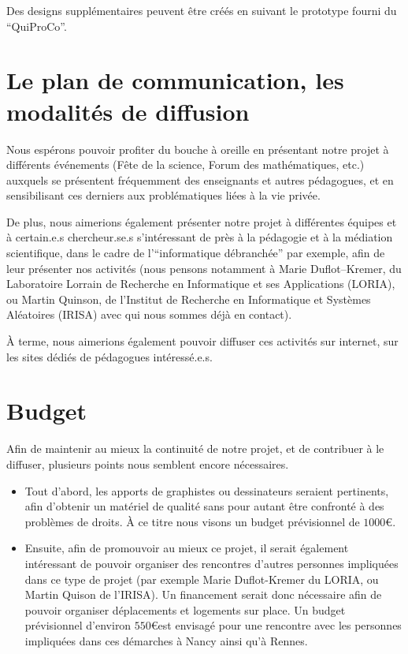 \documentclass[a4paper]{article}
\begin{document}
Des designs supplémentaires peuvent être créés en suivant le prototype fourni du \enquote{QuiProCo}.

\section*{Le plan de communication, les modalités de diffusion}

Nous espérons pouvoir profiter du bouche à oreille en présentant notre projet à différents événements (Fête de la science, Forum des mathématiques, etc.) auxquels se présentent fréquemment des enseignants et autres pédagogues, et en sensibilisant ces derniers aux problématiques liées à la vie privée.

De plus, nous aimerions également présenter notre projet à différentes équipes et à certain.e.s chercheur.se.s s'intéressant de près à la pédagogie et à la médiation scientifique, dans le cadre de l'\enquote{informatique débranchée} par exemple, afin de leur présenter nos activités (nous pensons notamment à Marie Duflot--Kremer, du Laboratoire Lorrain de Recherche en Informatique et ses Applications (LORIA), ou Martin Quinson, de l'Institut de Recherche en Informatique et Systèmes Aléatoires (IRISA) avec qui nous sommes déjà en contact).

À terme, nous aimerions également pouvoir diffuser ces activités sur internet, sur les sites dédiés de pédagogues intéressé.e.s.

\section*{Budget}

Afin de maintenir au mieux la continuité de notre projet, et de contribuer à le diffuser, plusieurs points nous semblent encore nécessaires.
\begin{itemize}
	\item Tout d'abord, les apports de graphistes ou dessinateurs seraient pertinents, afin d'obtenir un matériel de qualité sans pour autant être confronté à des problèmes de droits. À ce titre nous visons un budget prévisionnel de $1000$\euro.
	\item Ensuite, afin de promouvoir au mieux ce projet, il serait également intéressant de pouvoir organiser des rencontres d'autres personnes impliquées dans ce type de projet (par exemple Marie Duflot-Kremer du LORIA, ou Martin Quison de l'IRISA).
	Un financement serait donc nécessaire afin de pouvoir organiser déplacements et logements sur place. Un budget prévisionnel d'environ $550$\euro \space est envisagé pour une rencontre avec les personnes impliquées dans ces démarches à Nancy ainsi qu'à Rennes.
\end{itemize}
\end{document}
